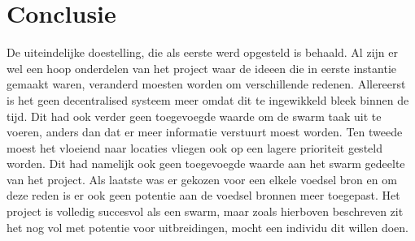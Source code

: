 \documentclass{article}
\begin{document}
\section{Conclusie}
De uiteindelijke doestelling, die als eerste werd opgesteld is behaald. Al zijn er wel een hoop onderdelen van het project waar de ideeen die in eerste instantie gemaakt waren, veranderd moesten worden om verschillende redenen. Allereerst is het geen decentralised systeem meer omdat dit te ingewikkeld bleek binnen de tijd. Dit had ook verder geen toegevoegde waarde om de swarm taak uit te voeren, anders dan dat er meer informatie verstuurt moest worden. Ten tweede moest het vloeiend naar locaties vliegen ook op een lagere prioriteit gesteld worden. Dit had namelijk ook geen toegevoegde waarde aan het swarm gedeelte van het project. Als laatste was er gekozen voor een elkele voedsel bron en om deze reden is er ook geen potentie aan de voedsel bronnen meer toegepast. 
Het project is volledig succesvol als een swarm, maar zoals hierboven beschreven zit het nog vol met potentie voor uitbreidingen, mocht een individu dit willen doen.

\newpage


\end{document}
